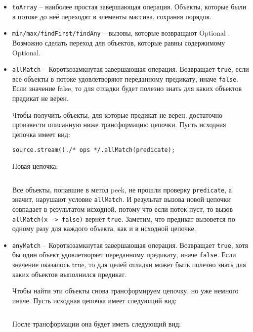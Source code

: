 \begin{itemize}
	\item \texttt{toArray} -- наиболее простая завершающая операция. Объекты, которые были в потоке до неё переходят в элементы массива, сохраняя порядок.
	\item \texttt{min/max/findFirst/findAny} -- вызовы, которые возвращают Optional \cite{java:optional}. Возможно сделать переход для объектов, которые равны содержимому Optional.
	\item \texttt{allMatch} -- Короткозамкнутая завершающая операция. Возвращает \texttt{true}, если все объекты в потоке удовлетворяют переданному предикату, иначе \texttt{false}. Если значение false, то для отладки будет полезно знать для каких объектов предикат не верен.
	
	Чтобы получить объекты, для которые предикат не верен, достаточно произвести описанную ниже трансформацию цепочки. Пусть исходная цепочка имеет вид:
	
	\texttt{source.stream()./* ops */.allMatch(predicate);}

	Новая цепочка:
	
	\inputminted{java}{chapter2/code/allMatchTransform.java}
	
	Все объекты, попавшие в метод peek, не прошли проверку \texttt{predicate}, а значит, нарушают условие \texttt{allMatch}. И результат вызова новой цепочки совпадает в результатом исходной, потому что если поток пуст, то вызов \\ \texttt{allMatch(x -> false)} вернёт \texttt{true}. Заметим, что предикат вызовется по одному разу для каждого объекта, как и в исходной цепочке.
	
	\item \texttt{anyMatch} -- Короткозамкнутая завершающая операция. Возвращает \texttt{true}, хотя бы один объект удовлетворяет переданному предикату, иначе \texttt{false}. Если значение оказалось true, то для целей отладки может быть полезно знать для каких объектов выполнился предикат.
	
	Чтобы найти эти объекты снова трансформируем цепочку, но уже немного иначе. Пусть исходная цепочка имеет следующий вид: 
	
	\inputminted{java}{chapter2/code/anyMatch.java}
	
	После трансформации она будет иметь следующий вид:
	
	\inputminted{java}{chapter2/code/anyMatchTransform.java}
	

\end{itemize}
